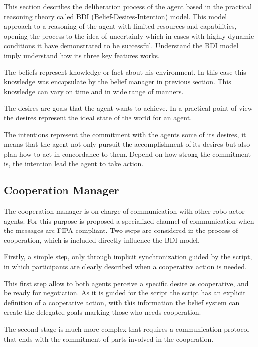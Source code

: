 This section describes the deliberation process of the agent based in the practical reasoning theory called BDI (Belief-Desires-Intention) model. This model approach to a reasoning of the agent with limited resources and capabilities, opening the process to the idea of uncertainly which in cases with highly dynamic conditions it have demonstrated to be successful. Understand the BDI model imply understand how its three key features works.

The beliefs represent knowledge or fact about his environment. In this case this knowledge was encapsulate by the belief manager in previous section. This knowledge can vary on time and in wide range of manners.

The desires are goals that the agent wants to achieve. In a practical point of view the desires represent the ideal state of the world for an agent.

The intentions represent the commitment with the agents some of its desires, it means that the agent not only pursuit the accomplishment of its desires but also plan how to act in concordance to them. Depend on how strong the commitment is, the intention lead the agent to take action.

\subsection{Cooperation Manager}

The cooperation manager is on charge of communication with other robo-actor agents. For this purpose is proposed a specialized channel of communication when the messages are FIPA compliant. Two steps are considered in the process of cooperation, which is included directly influence the BDI model. 

Firstly, a simple step, only through implicit synchronization guided by the script, in which participants are clearly described when a cooperative action is needed.

This first step allow to both agents perceive a specific desire as cooperative, and be ready for negotiation. As it is guided for the script the script has an explicit definition of a cooperative action, with this information the belief system can create the delegated goals marking those who needs cooperation.


The second stage is much more complex that requires a communication protocol that ends with the commitment of parts involved in the cooperation. 

